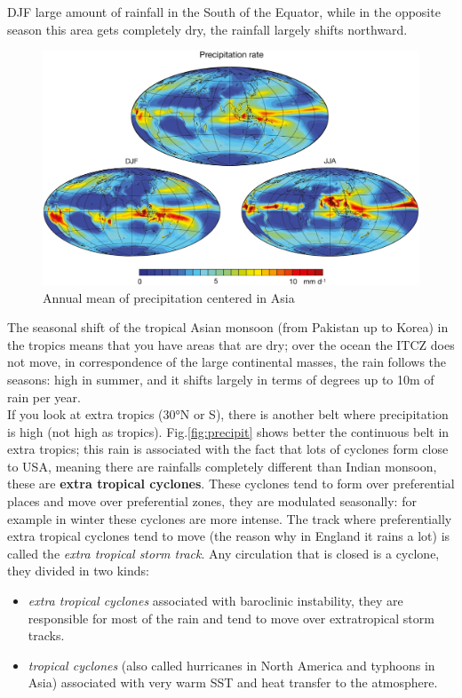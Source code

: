 DJF large amount of rainfall in the South of the Equator, while in the opposite season this area gets completely dry, the rainfall largely shifts northward. 
\begin{figure}[htpb]
    \centering
    \includegraphics[width=0.5\linewidth]{uploads/precip Asia.png}
    \caption{Annual mean of precipitation centered in Asia}
    \label{fig:precipit Asia}
\end{figure}
The seasonal shift of the tropical Asian monsoon (from Pakistan up to Korea) in the tropics means that you have areas that are dry; over the ocean the ITCZ does not move, in correspondence of the large continental masses, the rain follows the seasons: high in summer, and it shifts largely in terms of degrees up to 10m of rain per year.\\


If you look at extra tropics (30°N or S), there is another belt where precipitation is high (not high as tropics). Fig.\ref{fig:precipit} shows better the continuous belt in extra tropics; this rain is associated with the fact that lots of cyclones form close to USA, meaning there are rainfalls completely different than Indian monsoon, these are \textbf{extra tropical cyclones}. These cyclones tend to form over preferential places and move over preferential zones, they are modulated seasonally: for example in winter these cyclones are more intense. The track where preferentially extra tropical cyclones tend to move (the reason why in England it rains a lot) is called the \textit{ extra tropical storm track}. Any circulation that is closed is a cyclone, they divided in two kinds: 
\begin{itemize}
    \item \textit{extra tropical cyclones} associated with baroclinic instability, they are responsible for most of the rain and tend to move over extratropical storm tracks.
    \item \textit{tropical cyclones} (also called hurricanes in North America and typhoons in Asia) associated with very warm SST and heat transfer to the atmosphere.
\end{itemize}


